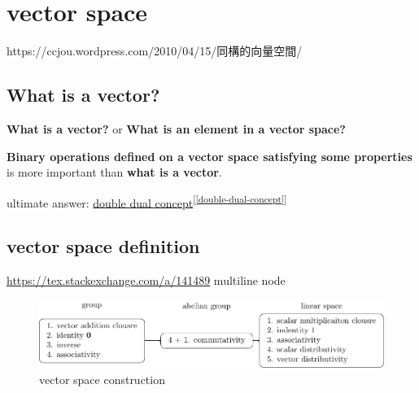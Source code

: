 \documentclass[
]{book}
\theoremstyle{definition}
\theoremstyle{definition}
\theoremstyle{definition}
\theoremstyle{definition}
\theoremstyle{remark}
\begin{document}
\chapter{vector space}\label{vector-space}

\begin{CJK}{UTF8}{bsmi}
https://ccjou.wordpress.com/2010/04/15/同構的向量空間/
\end{CJK}

\section{What is a vector?}\label{what-is-a-vector}

\textbf{What is a vector?} or \textbf{What is an element in a vector space?}

\textbf{Binary operations defined on a vector space satisfying some properties} is more important than \textbf{what is a vector}.

ultimate answer: \hyperref[double-dual-concept]{double dual concept}\textsuperscript{{[}\ref{double-dual-concept}{]}}

\section{vector space definition}\label{vector-space-definition}

\url{https://tex.stackexchange.com/a/141489} multiline node

\begin{figure}
\centering
\includegraphics{202403311536-vector-space_files/figure-latex/vector-construction-1.pdf}
\caption{\label{fig:vector-construction}vector space construction}
\end{figure}
\end{document}
